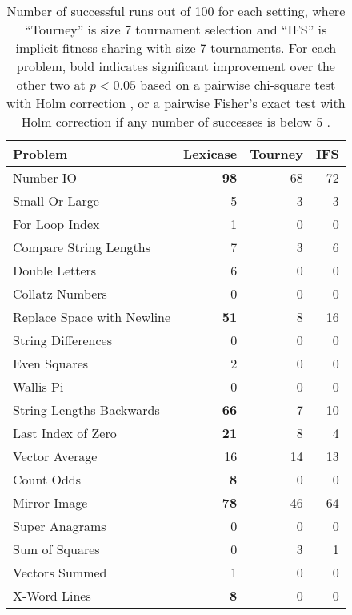 \documentclass{sig-alternate}
\begin{document}
\begin{table}[t]
\centering
\caption{Number of successful runs out of 100 for each setting, where ``Tourney'' is size 7 tournament selection and ``IFS'' is implicit fitness sharing with size 7 tournaments. For each problem, bold indicates significant improvement over the other two at $p < 0.05$ based on a pairwise chi-square test with Holm correction \cite{R}, or a pairwise Fisher's exact test with Holm correction if any number of successes is below 5 \cite{fmsb}.}
\label{tableResults}
\begin{tabular}{|l|rrr|}
\hline
Problem                    & Lexicase & Tourney & IFS \\
\hline
Number IO                  & \textbf{98}       & 68      & 72  \\
Small Or Large             & 5        & 3       & 3   \\
For Loop Index             & 1        & 0       & 0   \\
Compare String Lengths     & 7        & 3       & 6   \\
Double Letters             & 6        & 0       & 0   \\ 
Collatz Numbers            & 0        & 0       & 0   \\
Replace Space with Newline & \textbf{51}       & 8       & 16  \\
String Differences         & 0        & 0       & 0   \\
Even Squares               & 2        & 0       & 0   \\
Wallis Pi                  & 0        & 0       & 0   \\
String Lengths Backwards   & \textbf{66}       & 7       & 10  \\
Last Index of Zero         & \textbf{21}       & 8       & 4   \\
Vector Average             & 16       & 14      & 13  \\
Count Odds                 & \textbf{8}        & 0       & 0   \\
Mirror Image               & \textbf{78}       & 46      & 64  \\
Super Anagrams             & 0        & 0       & 0   \\
Sum of Squares             & 0        & 3       & 1   \\
Vectors Summed             & 1        & 0       & 0   \\
X-Word Lines               & \textbf{8}        & 0       & 0   \\

\end{tabular}
\end{table}
\end{document}
